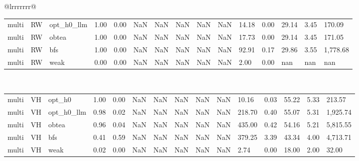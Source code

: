 \begin{table}[ht]
\begin{tabular}{@{}lrrrrrrr@{}}
\begin{tabular}{lllllllllllllll}
multi & RW & opt_h0_llm & 1.00 & 0.00 & NaN & NaN & NaN & NaN & NaN & 14.18 & 0.00 & 29.14 & 3.45 & 170.09 \\
multi & RW & obtea & 1.00 & 0.00 & NaN & NaN & NaN & NaN & NaN & 17.73 & 0.00 & 29.14 & 3.45 & 171.05 \\
multi & RW & bfs & 1.00 & 0.00 & NaN & NaN & NaN & NaN & NaN & 92.91 & 0.17 & 29.86 & 3.55 & 1,778.68 \\
multi & RW & weak & 0.00 & 0.00 & NaN & NaN & NaN & NaN & NaN & 2.00 & 0.00 & nan & nan & nan \\
\bottomrule
\end{tabular}
\midrule
{} \\
\begin{tabular}{lllllllllllllll}
\toprule
\midrule
multi & VH & opt_h0 & 1.00 & 0.00 & NaN & NaN & NaN & NaN & NaN & 10.16 & 0.03 & 55.22 & 5.33 & 213.57 \\
multi & VH & opt_h0_llm & 0.98 & 0.02 & NaN & NaN & NaN & NaN & NaN & 218.70 & 0.40 & 55.07 & 5.31 & 1,925.74 \\
multi & VH & obtea & 0.96 & 0.04 & NaN & NaN & NaN & NaN & NaN & 435.00 & 0.42 & 54.16 & 5.21 & 5,815.55 \\
multi & VH & bfs & 0.41 & 0.59 & NaN & NaN & NaN & NaN & NaN & 379.25 & 3.39 & 43.34 & 4.00 & 4,713.71 \\
multi & VH & weak & 0.02 & 0.00 & NaN & NaN & NaN & NaN & NaN & 2.74 & 0.00 & 18.00 & 2.00 & 32.00 \\
\bottomrule
\end{tabular}
\midrule
\bottomrule
\end{tabular}
\end{table}
\clearpage
